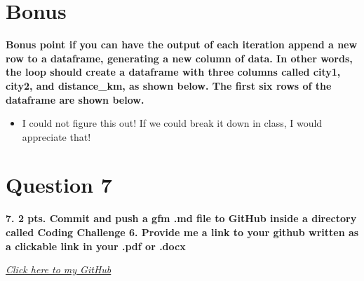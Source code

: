 \documentclass[
]{article}
\providecommand{\tightlist}{%
  \setlength{\itemsep}{0pt}\setlength{\parskip}{0pt}}
\begin{document}
\section{Bonus}\label{bonus}

\textbf{Bonus point if you can have the output of each iteration append
a new row to a dataframe, generating a new column of data. In other
words, the loop should create a dataframe with three columns called
city1, city2, and distance\_km, as shown below. The first six rows of
the dataframe are shown below.}

\begin{itemize}
\tightlist
\item
  I could not figure this out! If we could break it down in class, I
  would appreciate that!
\end{itemize}

\section{Question 7}\label{question-7}

\textbf{7. 2 pts. Commit and push a gfm .md file to GitHub inside a
directory called Coding Challenge 6. Provide me a link to your github
written as a clickable link in your .pdf or .docx}

\emph{\href{https://github.com/kzb0180}{Click here to my GitHub}}
\end{document}
